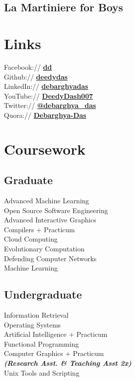 \documentclass[]{cv}
\begin{document}
\begin{minipage}[t]{0.33\textwidth}
{{{{    \subsection{La Martiniere for Boys}
    \sectionsep
    
    
    \section{Links} 
    Facebook:// \href{https://facebook/dd}{\bf dd} \\
    Github:// \href{https://github.com/deedydas}{\bf deedydas} \\
    LinkedIn://  \href{https://www.linkedin.com/in/debarghyadas}{\bf debarghyadas} \\
    YouTube://  \href{https://www.youtube.com/user/DeedyDash007}{\bf DeedyDash007} \\
    Twitter://  \href{https://twitter.com/debarghya_das}{\bf @debarghya\_das} \\
    Quora://  \href{https://www.quora.com/Debarghya-Das}{\bf Debarghya-Das}
    
    
    \section{Coursework}
    \subsection{Graduate}
    Advanced Machine Learning \\
    Open Source Software Engineering \\
    Advanced Interactive Graphics \\
    Compilers + Practicum \\
    Cloud Computing \\
    Evolutionary Computation \\
    Defending Computer Networks \\
    Machine Learning \\
    \sectionsep
    
    \subsection{Undergraduate}
    Information Retrieval \\
    Operating Systems \\
    Artificial Intelligence + Practicum \\
    Functional Programming \\
    Computer Graphics + Practicum \\
    {\footnotesize \textit{\textbf{(Research Asst. \& Teaching Asst 2x) }}} \\
    Unix Tools and Scripting \\
    
}}}}
\end{minipage}
\end{document}
